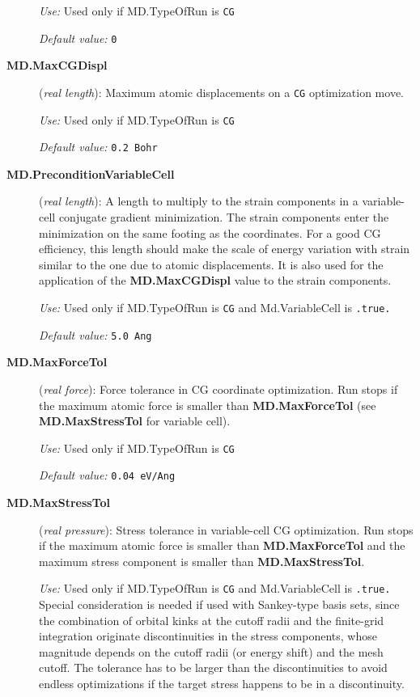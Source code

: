 \begin{description}
{\it Use:} Used only if MD.TypeOfRun is {\tt CG}
    
{\it Default value:} {\tt 0}

\item[{\bf MD.MaxCGDispl}] ({\it real length}): 
Maximum atomic displacements on a {\tt CG} optimization move.

{\it Use:} Used only if MD.TypeOfRun is {\tt CG}
    
{\it Default value:} {\tt 0.2 Bohr}


\item[{\bf MD.PreconditionVariableCell}] ({\it real length}):
A length to multiply to the strain components in a variable-cell conjugate
gradient minimization. The strain components enter the minimization
on the same footing as the coordinates. For a good CG efficiency, 
this length should make
the scale of energy variation with strain similar to the one 
due to atomic displacements. It is also
used for the application of the {\bf MD.MaxCGDispl} value to
the strain components.
 
{\it Use:} Used only if MD.TypeOfRun is {\tt CG} and Md.VariableCell
is {\tt .true.}
   
{\it Default value:} {\tt 5.0 Ang}
 
 
\item[{\bf MD.MaxForceTol}] ({\it real force}): 
Force tolerance in CG coordinate optimization.  
Run stops if the maximum atomic force is
smaller than {\bf MD.MaxForceTol} (see {\bf MD.MaxStressTol}
for variable cell).

{\it Use:} Used only if MD.TypeOfRun is {\tt CG}
    
{\it Default value:} {\tt 0.04 eV/Ang}


\item[{\bf MD.MaxStressTol}] ({\it real pressure}):
Stress tolerance in variable-cell CG optimization. Run stops
if the maximum atomic force is smaller than {\bf MD.MaxForceTol}
and the maximum stress component is smaller than {\bf MD.MaxStressTol}.

{\it Use:} Used only if MD.TypeOfRun is {\tt CG} and Md.VariableCell
is {\tt .true.}
Special consideration is needed if used with Sankey-type basis sets, since 
the combination of orbital kinks at the cutoff radii and the finite-grid
integration originate discontinuities in the
stress components, whose magnitude depends on the cutoff radii (or 
energy shift) and the mesh cutoff. The tolerance has to be larger
than the discontinuities to avoid endless optimizations if the target
stress happens to be in a discontinuity.
   

\end{description}
